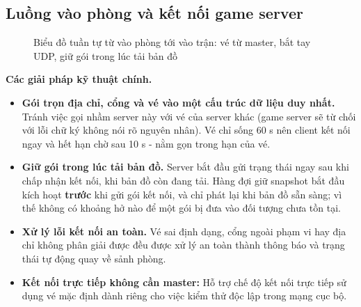 \subsection{Luồng vào phòng và kết nối game server}
\begin{figure}[H]
\centering
\renewcommand{\seqstep}{0.64cm}
\caption{Biểu đồ tuần tự từ vào phòng tới vào trận: vé từ master, bắt tay UDP, giữ gói trong lúc tải bản đồ}
\label{fig:A-luong-vaotran}
\end{figure}

\textbf{Các giải pháp kỹ thuật chính.}
\begin{itemize}
  \item \textbf{Gói trọn địa chỉ, cổng và vé vào một cấu trúc dữ liệu duy nhất.} Tránh việc gọi nhầm server này với vé của server khác (game server sẽ từ chối với lỗi chữ ký không nói rõ nguyên nhân). Vé chỉ sống 60 s nên client kết nối ngay và hết hạn chờ sau 10 s - nằm gọn trong hạn của vé.
  \item \textbf{Giữ gói trong lúc tải bản đồ.} Server bắt đầu gửi trạng thái ngay sau khi chấp nhận kết nối, khi bản đồ còn đang tải. Hàng đợi giữ snapshot bắt đầu kích hoạt \textbf{trước} khi gửi gói kết nối, và chỉ phát lại khi bản đồ sẵn sàng; vì thế không có khoảng hở nào để một gói bị đưa vào đối tượng chưa tồn tại.
  \item \textbf{Xử lý lỗi kết nối an toàn.} Vé sai định dạng, cổng ngoài phạm vi hay địa chỉ không phân giải được đều được xử lý an toàn thành thông báo và trạng thái tự động quay về sảnh phòng.
  \item \textbf{Kết nối trực tiếp không cần master:} Hỗ trợ chế độ kết nối trực tiếp sử dụng vé mặc định dành riêng cho việc kiểm thử độc lập trong mạng cục bộ.
\end{itemize}

